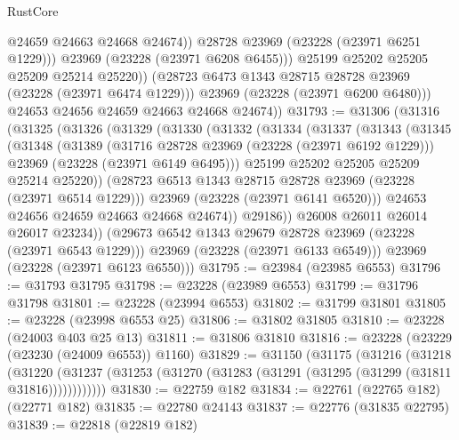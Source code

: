 \begin{lexlean}{RustCore}
\begin{coremodule}
                      @24659
                      @24663
                      @24668
                      @24674))
                  @28728
                  @23969
                  (@23228 (@23971 @6251 @1229)))
                @23969
                (@23228 (@23971 @6208 @6455)))
              @25199
              @25202
              @25205
              @25209
              @25214
              @25220))
          (@28723 @6473 @1343 @28715 @28728 @23969 (@23228 (@23971 @6474 @1229)))
          @23969
          (@23228 (@23971 @6200 @6480)))
        @24653
        @24656
        @24659
        @24663
        @24668
        @24674))
@31793 := @31306
    (@31316
      (@31325
        (@31326
          (@31329
            (@31330
              (@31332
                (@31334
                  (@31337
                    (@31343
                      (@31345
                        (@31348
                          (@31389
                            (@31716 @28728 @23969 (@23228 (@23971 @6192 @1229)))
                            @23969
                            (@23228 (@23971 @6149 @6495)))
                          @25199
                          @25202
                          @25205
                          @25209
                          @25214
                          @25220))
                      (@28723 @6513 @1343 @28715 @28728 @23969 (@23228 (@23971 @6514 @1229)))
                      @23969
                      (@23228 (@23971 @6141 @6520)))
                    @24653
                    @24656
                    @24659
                    @24663
                    @24668
                    @24674))
                @29186))
            @26008
            @26011
            @26014
            @26017
            @23234))
        (@29673 @6542 @1343 @29679 @28728 @23969 (@23228 (@23971 @6543 @1229)))
        @23969
        (@23228 (@23971 @6133 @6549)))
      @23969
      (@23228 (@23971 @6123 @6550)))
@31795 := @23984 (@23985 @6553)
@31796 := @31793 @31795
@31798 := @23228 (@23989 @6553)
@31799 := @31796 @31798
@31801 := @23228 (@23994 @6553)
@31802 := @31799 @31801
@31805 := @23228 (@23998 @6553 @25)
@31806 := @31802 @31805
@31810 := @23228 (@24003 @403 @25 @13)
@31811 := @31806 @31810
@31816 := @23228 (@23229 (@23230 (@24009 @6553)) @1160)
@31829 := @31150
    (@31175
      (@31216
        (@31218
          (@31220 (@31237 (@31253 (@31270 (@31283 (@31291 (@31295 (@31299 (@31811 @31816))))))))))))
@31830 := @22759 @182
@31834 := @22761 (@22765 @182) (@22771 @182)
@31835 := @22780 @24143
@31837 := @22776 (@31835 @22795)
@31839 := @22818 (@22819 @182)

\end{coremodule}
\end{lexlean}
